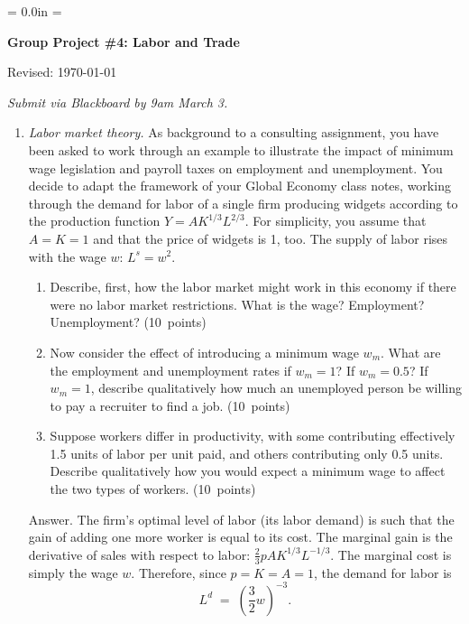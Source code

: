 \documentclass[letterpaper,12pt]{article}
\def\HeadName{Group Project \#4}
\begin{document}
\parindent = 0.0in
\parskip = \bigskipamount
\thispagestyle{empty}%
\Head

\centerline{\large \bf \HeadName:  Labor and Trade}%
\centerline{Revised:  \today}

\medskip
{\it Submit via Blackboard by 9am March 3.}

\begin{enumerate}

\item {\it Labor market theory.\/} As background to a
consulting assignment, you have been asked to work through an
example to illustrate the impact of
minimum wage legislation and payroll taxes on employment and
unemployment. You decide to adapt the framework of your 
{Global Economy} class notes, 
working through the demand for labor
of a single firm producing widgets according to the production
function $Y= A K^{1/3}L^{2/3}$. For simplicity, you assume that
$A=K=1$ and that the price of widgets is 1, too.  The supply of
labor rises with the wage $w$: $L^{s}=w^{2}$.
%
\begin{enumerate}

\item Describe, first, how the labor market might work in this
economy if there were no labor market restrictions.  
What is the wage?
Employment? Unemployment?  (10~points)

\item Now consider the effect of introducing a minimum wage $w_{m}$.  
What are the employment and unemployment rates if $w_{m}=1$?
If $w_{m}=0.5$?  
If $w_m = 1$, describe qualitatively how much 
an unemployed person be willing to pay a recruiter
to find a job.  
(10~points)

\item Suppose workers differ in productivity, 
with some contributing effectively 1.5 units of labor 
per unit paid, and others contributing only 0.5 units.  
Describe qualitatively how  you would expect a minimum wage  
to affect the two types of workers.  
(10~points)

\end{enumerate}

Answer. The firm's optimal level of labor (its labor demand) is
such that the gain of adding one more worker is equal to its cost.
The marginal gain is the derivative of sales with respect to
labor: $\frac{2}{3}pAK^{1/3}L^{-1/3}$. The marginal cost is simply
the wage $w$. Therefore, since $p=K=A=1$, the demand for labor is
\[
    L^{d} \;=\; \left(\frac{3}{2}w\right)^{-3}.
\] 


\end{enumerate}
\end{document}
